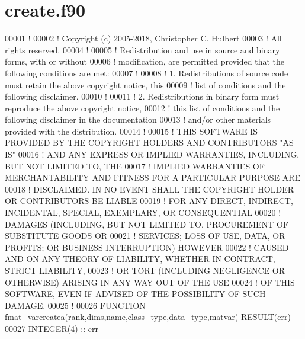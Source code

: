 \hypertarget{create_8f90_source}{}\section{create.\+f90}
\label{create_8f90_source}

\begin{DoxyCode}
00001 \textcolor{comment}{!}
00002 \textcolor{comment}{! Copyright (c) 2005-2018, Christopher C. Hulbert}
00003 \textcolor{comment}{! All rights reserved.}
00004 \textcolor{comment}{!}
00005 \textcolor{comment}{! Redistribution and use in source and binary forms, with or without}
00006 \textcolor{comment}{! modification, are permitted provided that the following conditions are met:}
00007 \textcolor{comment}{!}
00008 \textcolor{comment}{! 1. Redistributions of source code must retain the above copyright notice, this}
00009 \textcolor{comment}{!    list of conditions and the following disclaimer.}
00010 \textcolor{comment}{!}
00011 \textcolor{comment}{! 2. Redistributions in binary form must reproduce the above copyright notice,}
00012 \textcolor{comment}{!    this list of conditions and the following disclaimer in the documentation}
00013 \textcolor{comment}{!    and/or other materials provided with the distribution.}
00014 \textcolor{comment}{!}
00015 \textcolor{comment}{! THIS SOFTWARE IS PROVIDED BY THE COPYRIGHT HOLDERS AND CONTRIBUTORS "AS IS"}
00016 \textcolor{comment}{! AND ANY EXPRESS OR IMPLIED WARRANTIES, INCLUDING, BUT NOT LIMITED TO, THE}
00017 \textcolor{comment}{! IMPLIED WARRANTIES OF MERCHANTABILITY AND FITNESS FOR A PARTICULAR PURPOSE ARE}
00018 \textcolor{comment}{! DISCLAIMED. IN NO EVENT SHALL THE COPYRIGHT HOLDER OR CONTRIBUTORS BE LIABLE}
00019 \textcolor{comment}{! FOR ANY DIRECT, INDIRECT, INCIDENTAL, SPECIAL, EXEMPLARY, OR CONSEQUENTIAL}
00020 \textcolor{comment}{! DAMAGES (INCLUDING, BUT NOT LIMITED TO, PROCUREMENT OF SUBSTITUTE GOODS OR}
00021 \textcolor{comment}{! SERVICES; LOSS OF USE, DATA, OR PROFITS; OR BUSINESS INTERRUPTION) HOWEVER}
00022 \textcolor{comment}{! CAUSED AND ON ANY THEORY OF LIABILITY, WHETHER IN CONTRACT, STRICT LIABILITY,}
00023 \textcolor{comment}{! OR TORT (INCLUDING NEGLIGENCE OR OTHERWISE) ARISING IN ANY WAY OUT OF THE USE}
00024 \textcolor{comment}{! OF THIS SOFTWARE, EVEN IF ADVISED OF THE POSSIBILITY OF SUCH DAMAGE.}
00025 \textcolor{comment}{!}
00026 \textcolor{keyword}{FUNCTION }fmat\_varcreatea(rank,dims,name,class\_type,data\_type,matvar) \textcolor{keyword}{RESULT}(err)
00027     \textcolor{keywordtype}{INTEGER(4)}                         :: err

\end{DoxyCode}
